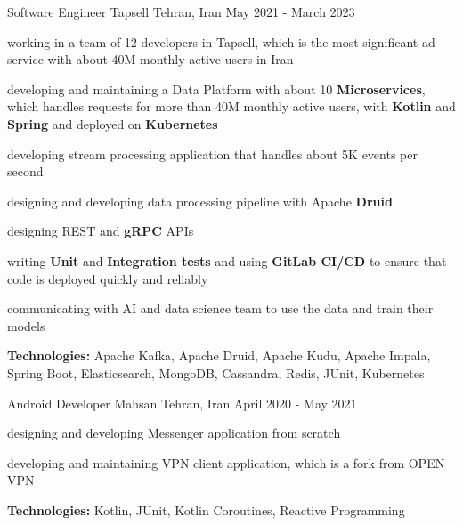 \begin{cventries}
    \cventry
    {Software Engineer} %
    {Tapsell} %
    {Tehran, Iran} %
    {May 2021 - March 2023} %
    {
      \begin{cvitems} %
        \item working in a team of 12 developers in Tapsell, which is the most significant ad service with about 40M monthly active users in Iran
        \item developing and maintaining a Data Platform with about 10 \textbf{Microservices}, which handles requests for more than 40M monthly active users, with \textbf{Kotlin} and 
        \textbf{Spring} and deployed on \textbf{Kubernetes} 
        \item developing stream processing application that handles about 5K events per second
        \item designing and developing data processing pipeline with Apache \textbf{Druid}
        \item designing REST and \textbf{gRPC} APIs
        \item writing \textbf{Unit} and \textbf{Integration tests} and using \textbf{GitLab CI/CD} to ensure that code is deployed quickly and reliably
        \item communicating with AI and data science team to use the data and train their models
        \item \textbf{Technologies:} Apache Kafka, Apache Druid, Apache Kudu, Apache Impala, Spring Boot, Elasticsearch, MongoDB, Cassandra, Redis, JUnit, Kubernetes
      \end{cvitems}
    }

    \cventry
    {Android Developer} %
    {Mahsan} %
    {Tehran, Iran} %
    {April 2020 - May 2021} %
    {
      \begin{cvitems} %
        \item designing and developing Messenger application from scratch
        \item developing and maintaining VPN client application, which is a fork from OPEN VPN
        \item \textbf{Technologies:} Kotlin, JUnit, Kotlin Coroutines, Reactive Programming
      \end{cvitems}
    }


\end{cventries}
